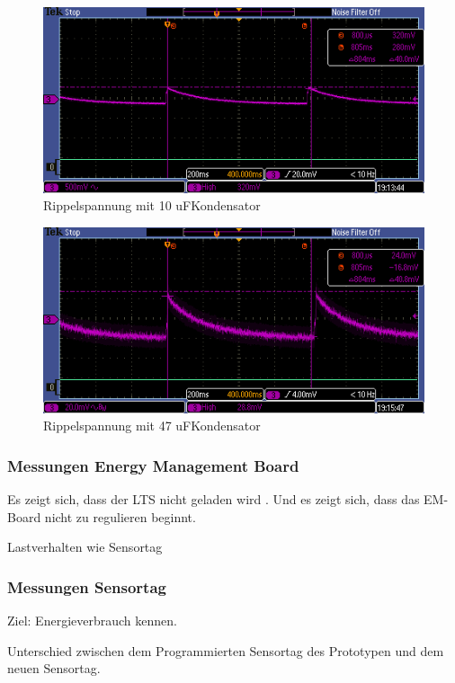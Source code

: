 \begin{figure}
\includegraphics[bb = 0 0 100 100]{3Vorgehen/imag/10uF.PNG}
\caption{Rippelspannung mit 10 uFKondensator}
\end{figure}

\begin{figure}
\includegraphics[bb = 0 0 100 100]{3Vorgehen/imag/47uF.PNG}
\caption{Rippelspannung mit 47 uFKondensator}
\end{figure}

\pagebreak 
\subsubsection{Messungen Energy Management Board}

 
Es zeigt sich, dass der LTS nicht geladen wird . Und es zeigt sich, dass das EM-Board nicht zu regulieren beginnt.


Lastverhalten wie Sensortag






\pagebreak
\subsubsection{Messungen Sensortag}
Ziel: Energieverbrauch kennen.

Unterschied zwischen dem Programmierten Sensortag des Prototypen und dem neuen Sensortag.




